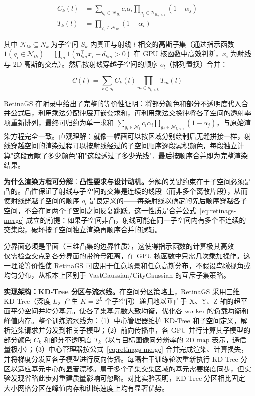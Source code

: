 \begin{align}
C_k(l) &= \sum_{g_i \in \mathcal{N}_{lk}} c_i \alpha_i \prod_{g_j \in \mathcal{N}_{lk,<i}}(1-\alpha_j) \label{eq:retinags-partial-color} \\
T_k(l) &= \prod_{g_i \in \mathcal{N}_{lk}} (1-\alpha_i) \label{eq:retinags-partial-trans}
\end{align}

其中 $\mathcal{N}_{lk} \subseteq N_k$ 为子空间 $S_k$ 内真正与射线 $l$ 相交的高斯子集（通过指示函数 $1(g_i \in \mathcal{N}_{lk}) = \prod_m 1(\mathbf{n}_{km}^\top x_i + d_{km} > 0)$ 在 GPU 核函数中高效判断，$x_i$ 为射线与 2D 高斯的交点）。然后按射线穿越子空间的顺序 $o_l$（排列置换）合并：

\begin{equation}
\label{eq:retinags-merge}
C(l) = \sum_{k \in o_l} C_k(l) \prod_{m \in o_{l,<k}} T_m(l)
\end{equation}

RetinaGS 在附录中给出了完整的等价性证明：将部分颜色和部分不透明度代入合并公式后，利用乘法分配律展开嵌套求和，再利用乘法交换律将各子空间的透射率项重新排列，最终可归约为单一求和 $\sum_{g_i \in \mathcal{N}_l} c_i \alpha_i \prod_{g_j \in \mathcal{N}_{l,<i}}(1-\alpha_j)$，与原始渲染方程完全一致。直观理解：就像一幅画可以按区域分别绘制后无缝拼接一样，射线穿越空间的渲染过程可以按射线经过的子空间顺序逐段累积颜色，每段独立计算"这段贡献了多少颜色"和"这段透过了多少光线"，最后按顺序合并即为完整渲染结果。

\textbf{为什么渲染方程可分解：凸性要求与设计动机。}分解的关键约束在于子空间必须是凸的。凸性保证了射线与子空间的交集是连续的线段（而非多个离散片段），从而使射线穿越子空间的顺序 $o_l$ 是良定义的——每条射线以确定的先后顺序穿越各子空间，不会在同两个子空间之间反复跳跃。这一性质是合并公式~\eqref{eq:retinags-merge} 成立的前提：如果子空间非凸，射线可能在同一子空间内有多个不连续的交集段，破坏按子空间独立渲染再顺序合并的逻辑。

分界面必须是平面（三维凸集的边界性质），这使得指示函数的计算极其高效——仅需检查交点到各分界面的带符号距离，在 GPU 核函数中只需几次乘加操作。这一理论等价性使 RetinaGS 可应用于任意场景和任意高斯分布，不假设鸟瞰视角或均匀分布，从根本上区别于 VastGaussian/CityGaussian 的互斥子集策略。

\textbf{实现架构：KD-Tree 分区与流水线。}在空间分区策略上，RetinaGS 采用三维 KD-Tree（深度 $L$，产生 $K = 2^L$ 个子空间）递归地以垂直于 X、Y、Z 轴的超平面平分空间并均分基元，使各子集基元数大致均衡，优化各 worker 的负载均衡和峰值内存。整个训练流水线为：（1）中心管理器维护 KD-Tree 和子空间定义，解析渲染请求并分发到相关子模型；（2）前向传播中，各 GPU 并行计算其子模型的部分颜色 $C_k$ 和部分不透明度 $T_k$（以与目标图像同分辨率的 2D map 表示，通信量极小）；（3）中心管理器按公式~\eqref{eq:retinags-merge} 合并完成渲染、计算损失，并将梯度分发回各子模型进行反向传播。每隔若干训练轮次重新执行 KD-Tree 分区以适应基元中心的显著漂移。属于多个子集交集区域的基元需要梯度同步，但实验发现省略此步对重建质量影响可忽略。对比实验表明，KD-Tree 分区相比固定大小网格分区在峰值内存和训练速度上均有显著优势。

